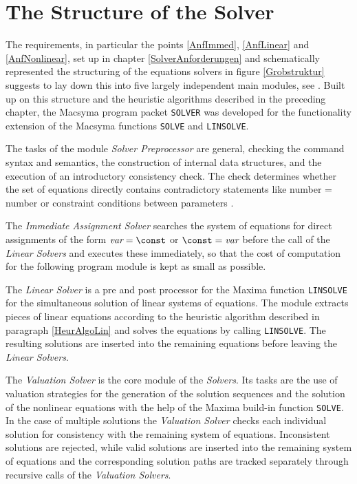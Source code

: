 \section{The Structure of the Solver}

The requirements, in particular the points  \ref{AnfImmed}, \ref{AnfLinear} and
\ref{AnfNonlinear}, set up in  chapter \ref{SolverAnforderungen} and schematically represented the structuring of the equations solvers  in figure \ref{Grobstruktur} suggests to lay down this into five largely independent main modules, see \cite{Trispel}. Built up on this structure and the heuristic algorithms described in the preceding chapter,  the Macsyma program packet \verb+SOLVER+ was developed for the functionality extension of the Macsyma functions \verb+SOLVE+ and \verb+LINSOLVE+.

The tasks of the module {\em Solver Preprocessor} are general, checking the command syntax and semantics, the construction of internal data structures, and the execution of an introductory consistency check. The check determines whether the set of equations directly contains contradictory  statements like  number = number or constraint conditions between parameters .

The {\em Immediate Assignment Solver}  searches the system of equations for direct assignments of the form $\mbox{\em var} = \const$ or $\const = \mbox{\em var}$ before the call of the {\em Linear Solvers}  and executes these immediately, so that the cost of computation  for the following program module is kept as small as possible.

The  {\em Linear Solver} is a pre and post processor for the Maxima function \verb+LINSOLVE+  for the simultaneous solution of linear systems of equations. The module extracts  pieces  of linear equations according to the heuristic algorithm described in paragraph \ref{HeurAlgoLin}  and solves the equations by calling \verb+LINSOLVE+. The resulting solutions are inserted into the remaining equations before leaving the {\em Linear Solvers}.

The {\em Valuation Solver} is the core module of the  {\em Solvers}. Its tasks are the use of valuation strategies for the generation of the solution sequences and the solution of the nonlinear equations with the help of the Maxima build-in function \verb+SOLVE+. In the case of multiple solutions the {\em Valuation Solver}  checks each individual solution for consistency with the remaining system of equations. Inconsistent solutions are rejected, while valid solutions are inserted into the remaining system  of equations and the corresponding solution paths are tracked separately through recursive  calls of the {\em Valuation Solvers}.

